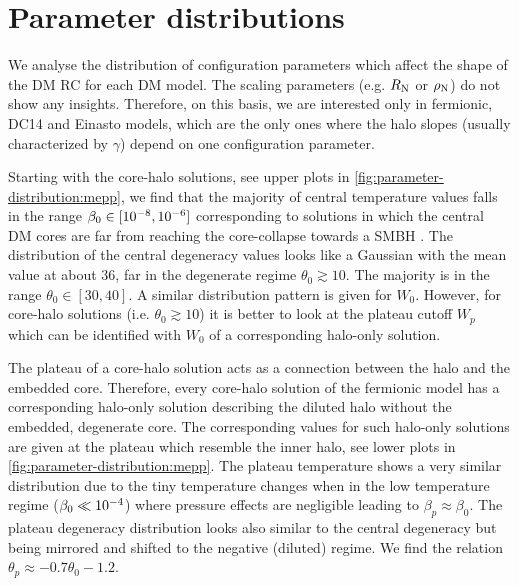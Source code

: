 \section{Parameter distributions}
\label{sec:appendix:parameter-distribution}

We analyse the distribution of configuration parameters which affect the shape of the DM RC for each DM model. The scaling parameters (e.g. $R_{\rm N}$ or $\rho_{\rm N}$) do not show any insights. Therefore, on this basis, we are interested only in fermionic, DC14 and Einasto models, which are the only ones where the halo slopes (usually characterized by $\gamma$) depend on one configuration parameter.


Starting with the core-halo solutions, see upper plots in \cref{fig:parameter-distribution:mepp}, we find that the majority of central temperature values falls in the range $\beta_0 \in [\num{E-8}, \num{E-6}]$ corresponding to solutions in which the central DM cores are far from reaching the core-collapse towards a SMBH \citep{2019PDU....24..278A,2021MNRAS.502.4227A}. The distribution of the central degeneracy values looks like a Gaussian with the mean value at about 36, far in the degenerate regime $\theta_0 \gtrsim 10$. The majority is in the range $\theta_0 \in [30, 40]$. A similar distribution pattern is given for $W_0$. However, for core-halo solutions (i.e. $\theta_0 \gtrsim 10$) it is better to look at the plateau cutoff $W_p$ which can be identified with $W_0$ of a corresponding halo-only solution.

The plateau of a core-halo solution acts as a connection between the halo and the embedded core. Therefore, every core-halo solution of the fermionic model has a corresponding halo-only solution describing the diluted halo without the embedded, degenerate core. The corresponding values for such halo-only solutions are given at the plateau which resemble the inner halo, see lower plots in \cref{fig:parameter-distribution:mepp}. The plateau temperature shows a very similar distribution due to the tiny temperature changes when in the low temperature regime ($\beta_0 \ll \num{E-4}$) where pressure effects are negligible leading to $\beta_p \approx \beta_0$. The plateau degeneracy distribution looks also similar to the central degeneracy but being mirrored and shifted to the negative (diluted) regime. We find the relation $\theta_p \approx -0.7 \theta_0 - 1.2$.

